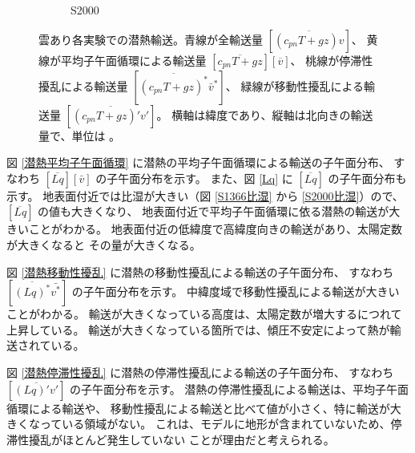 \documentclass[body]{subfiles}
\begin{document}
\begin{figure}[t]
\begin{subfigure}{.4\textwidth}
		\caption{S2000}\label{乾燥静的エネルギーS2000}
	\end{subfigure}
	\caption[雲あり各実験での乾燥静的エネルギー輸送の内訳]{
		雲あり各実験での潜熱輸送。青線が全輸送量 \([\overline{(c_{pn}T+gz)v}]\)、
		黄線が平均子午面循環による輸送量 \([\overline{c_{pn}T+gz}][\overline{v}]\)、
		桃線が停滞性擾乱による輸送量 \([\overline{(c_{pn}T+gz)^*}\bar v^*]\)、
		緑線が移動性擾乱による輸送量 \([\overline{(c_{pn}T+gz)'v'}]\)。
		横軸は緯度であり、縦軸は北向きの輸送量で、単位は 。
	}\label{乾燥静的エネルギー}
\end{figure}

\afterpage{\clearpage}

図 \ref{潜熱平均子午面循環} に潜熱の平均子午面循環による輸送の子午面分布、
すなわち \([\overline{Lq}][\bar v]\) の子午面分布を示す。
また、図 \ref{Lq} に \([\overline{Lq}]\) の子午面分布も示す。
地表面付近では比湿が大きい（図 \ref{S1366比湿} から \ref{S2000比湿}）ので、
\([\overline{Lq}]\) の値も大きくなり、
地表面付近で平均子午面循環に依る潜熱の輸送が大きいことがわかる。
地表面付近の低緯度で高緯度向きの輸送があり、太陽定数が大きくなると
その量が大きくなる。

図 \ref{潜熱移動性擾乱} に潜熱の移動性擾乱による輸送の子午面分布、
すなわち \([\overline{(Lq)^*}\bar{v^*}]\) の子午面分布を示す。
中緯度域で移動性擾乱による輸送が大きいことがわかる。
輸送が大きくなっている高度は、太陽定数が増大するにつれて上昇している。
輸送が大きくなっている箇所では、傾圧不安定によって熱が輸送されている。

図 \ref{潜熱停滞性擾乱} に潜熱の停滞性擾乱による輸送の子午面分布、
すなわち \([\overline{(Lq)'v'}]\) の子午面分布を示す。
潜熱の停滞性擾乱による輸送は、平均子午面循環による輸送や、
移動性擾乱による輸送と比べて値が小さく、特に輸送が大きくなっている領域がない。
これは、モデルに地形が含まれていないため、停滞性擾乱がほとんど発生していない
ことが理由だと考えられる。
\end{document}
